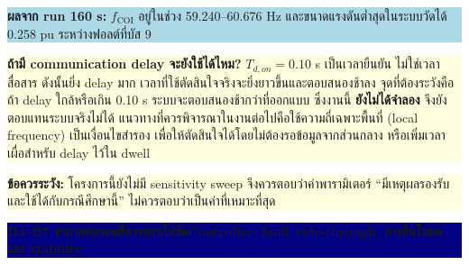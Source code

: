 \documentclass[12pt,a4paper]{article}
\newcommand{\sectitle}[2]{\noindent\colorbox{navy}{\parbox{\dimexpr\textwidth-2\fboxsep\relax}{\color{white}\Large\bfseries #1\hfill\normalsize #2}}\par\vspace{4pt}}
\newcommand{\warnbox}[1]{\noindent\colorbox{lightyellow}{\parbox{\dimexpr\textwidth-2\fboxsep\relax}{\textbf{ข้อควรระวัง:} #1}}}
\begin{document}
\noindent\colorbox{lightblue}{\parbox{\dimexpr\textwidth-2\fboxsep\relax}{\small\textbf{ผลจาก run 160 s:} $f_{\mathrm{COI}}$ อยู่ในช่วง 59.240--60.676 Hz และขนาดแรงดันต่ำสุดในระบบวัดได้ 0.258 pu ระหว่างฟอลต์ที่บัส 9}}

\vspace{3pt}
\noindent\colorbox{lightyellow}{\parbox{\dimexpr\textwidth-2\fboxsep\relax}{\small\textbf{ถ้ามี communication delay จะยังใช้ได้ไหม?} $T_{d,on}=0.10$ s เป็นเวลายืนยัน ไม่ใช่เวลาสื่อสาร ดังนั้นยิ่ง delay มาก เวลาที่ใช้ตัดสินใจจริงจะยิ่งยาวขึ้นและตอบสนองช้าลง จุดที่ต้องระวังคือถ้า delay ใกล้หรือเกิน 0.10 s ระบบจะตอบสนองช้ากว่าที่ออกแบบ ซึ่งงานนี้ \textbf{ยังไม่ได้จำลอง} จึงยังตอบแทนระบบจริงไม่ได้ แนวทางที่ควรพิจารณาในงานต่อไปคือใช้ความถี่เฉพาะพื้นที่ (local frequency) เป็นเงื่อนไขสำรอง เพื่อให้ตัดสินใจได้โดยไม่ต้องรอข้อมูลจากส่วนกลาง หรือเพิ่มเวลาเผื่อสำหรับ delay ไว้ใน dwell}}

\vfill
\warnbox{โครงการนี้ยังไม่มี sensitivity sweep จึงควรตอบว่าค่าพารามิเตอร์ ``มีเหตุผลรองรับและใช้ได้กับกรณีศึกษานี้'' ไม่ควรตอบว่าเป็นค่าที่เหมาะที่สุด}
\clearpage

\sectitle{B4--B7 คำถามต่อยอดที่ควรตอบให้ชัด}{Controller, fault ride-through, การคืนโหมด และ stability}
\end{document}
